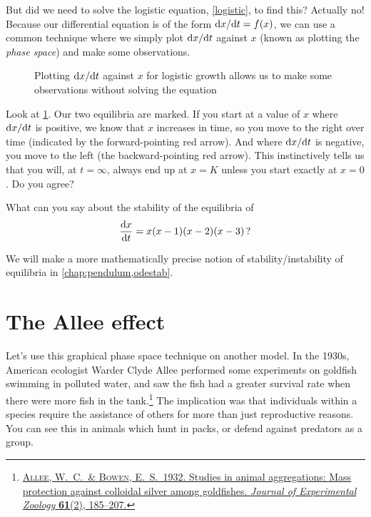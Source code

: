 \documentclass[main.tex]{subfiles}
\begin{document}
But did we need to solve the logistic equation, \cref{logistic}, to find this? Actually no! Because our differential equation is of the form $\fd{x}{t} = f(x)$, we can use a common technique where we simply plot $\fd{x}{t}$ against $x$ (known as plotting the \emph{phase space}) and make some observations. 

\begin{figure}%
	\centering
	
	\caption{Plotting $\fd{x}{t}$ against $x$ for logistic growth allows us to make some observations without solving the equation}
	\label{fig:logistic-growth-deriv}
\end{figure}%

Look at \cref{fig:logistic-growth-deriv}. Our two equilibria are marked. If you start at a value of $x$ where $\fd{x}{t}$ is positive, we know that $x$ increases in time, so you move to the right over time (indicated by the forward-pointing red arrow). And where $\fd{x}{t}$ is negative, you move to the left (the backward-pointing red arrow). This instinctively tells us that you will, at $t=\infty$, always end up at $x=K$ unless you start exactly at $x=0$. Do you agree?

\begin{do-it-yourself}
	What can you say about the stability of the equilibria of 
	\begin{equation}
		\fd{x}{t} = x(x-1)(x-2)(x-3) \, ?
	\end{equation}
\end{do-it-yourself}

We will make a more mathematically precise notion of stability/instability of equilibria in \cref{chap:pendulum,odestab}.

\section{The Allee effect}\label{sec:allee}
Let's use this graphical phase space technique on another model. In the 1930s, American ecologist Warder Clyde Allee performed some experiments on goldfish swimming in polluted water, and saw the fish had a greater survival rate when there were more fish in the tank.\footnote{\href{https://onlinelibrary.wiley.com/doi/10.1002/jez.1400610202}{\textsc{Allee}, W.\ C.\ \& \textsc{Bowen}, E.\ S.\  1932. Studies in animal aggregations: Mass protection against colloidal silver among goldfishes. \emph{Journal of Experimental Zoology} \textbf{61}(2), 185--207.}} The implication was that individuals within a species require the assistance of others for more than just reproductive reasons. You can see this in animals which hunt in packs, or defend against predators as a group. 
\end{document}
